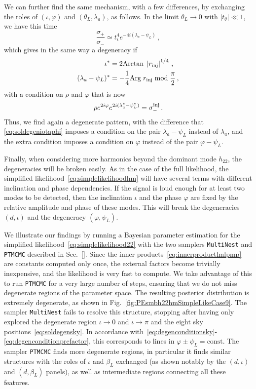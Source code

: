 \documentclass[aps,showpacs,twocolumn,prd,superscriptaddress,nofootinbib]{revtex4-1}
\newcommand{\be}{\begin{equation}}
\newcommand{\ee}{\end{equation}}
\newcommand{\bsub}{\begin{subequations}}
\newcommand{\esub}{\end{subequations}}
\newcommand\betaL{{\beta_{L}}}
\newcommand\psiL{{\psi_{L}}}
\begin{document}
We can further find the same mechanism, with a few differences, by exchanging the roles of $(\iota, \varphi)$ and $(\theta_{L}, \lambda_{a})$, as follows. In the limit $\theta_{L} \rightarrow 0$ with $|t_{\theta}| \ll 1$, we have this time
\be
	\frac{\sigma_{+}}{\sigma_{-}} \simeq t_{\iota}^{4} e^{-4i(\lambda_{a} - \psi_{L})} \,,
\ee
which gives in the same way a degeneracy if
\bsub\label{eq:soldegeniotaphi}
\begin{align}
	\iota^{*} &= 2 \mathrm{Arctan} \; \left| r_{\rm inj}\right|^{1/4} \,, \\
	(\lambda_{a} - \psiL)^{*} &= -\frac{1}{4} \mathrm{Arg} \; r_{\rm inj} \;\mathrm{mod}\; \frac{\pi}{2} \,,
\end{align}
\esub
with a condition on $\rho$ and $\varphi$ that is now
\be
	\rho e^{2i\varphi} e^{2i (\lambda_{a}^{*} - \psi_{L}^{*})} = \sigma_{-}^{\rm inj} \,.
\ee
Thus, we find again a degenerate pattern, with the difference that \eqref{eq:soldegeniotaphi} imposes a condition on the pair $\lambda_{a} - \psiL$ instead of $\lambda_{a}$, and the extra condition imposes a condition on $\varphi$ instead of the pair $\varphi - \psiL$.

Finally, when considering more harmonics beyond the dominant mode $h_{22}$, the degeneracies will be broken easily. As in the case of the full likelihood, the simplified likelihood~\eqref{eq:simplelikelihoodhm} will have several terms with different inclination and phase dependencies. If the signal is loud enough for at least two modes to be detected, then the inclination $\iota$ and the phase $\varphi$ are fixed by the relative amplitude and phase of these modes. This will break the degeneracies $(d, \iota)$ and the degeneracy $(\varphi, \psiL)$.  

We illustrate our findings by running a Bayesian parameter estimation for the simplified likelihood~\eqref{eq:simplelikelihood22} with the two samplers \texttt{MultiNest} and \texttt{PTMCMC} described in Sec.~\ref{}. Since the inner products~\eqref{eq:innerproductlmlpmp} are constants computed only once, the external factors become trivially inexpensive, and the likelihood is very fast to compute. We take advantage of this to run \texttt{PTMCMC} for a very large number of steps, ensuring that we do not miss degenerate regions of the parameter space. The resulting posterior distribution is extremely degenerate, as shown in Fig.~\ref{fig:PEsmbh22hmSimpleLikeCase9}. The sampler \texttt{MultiNest} fails to resolve this structure, stopping after having only explored the degenerate region $\iota \rightarrow 0$ and $\iota \rightarrow \pi$ and the eight sky positions~\eqref{eq:soldegensky}. In accordance with~\eqref{eq:degenconditionsky}-\eqref{eq:degenconditionprefactor}, this corresponds to lines in $\varphi \pm \psiL = \mathrm{const}$. The sampler \texttt{PTMCMC} finds more degenerate regions, in particular it finds similar structures with the roles of $\iota$ and $\betaL$ exchanged (as shown notably by the $(d,\iota)$ and $(d,\betaL)$ panels), as well as intermediate regions connecting all these features. 
\end{document}
